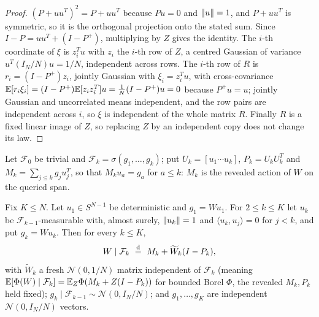 \begin{proof}
$(P+uu^T)^2=P+uu^T$ because $Pu=0$ and $\left\lVert u\right\rVert=1$, and $P+uu^T$ is symmetric, so it is the orthogonal projection onto the stated sum. Since $I-P=uu^T+(I-P^+)$, multiplying by $Z$ gives the identity. The $i$-th coordinate of $\xi$ is $z_i^Tu$ with $z_i$ the $i$-th row of $Z$, a centred Gaussian of variance $u^T(I_N/N)u=1/N$, independent across rows. The $i$-th row of $R$ is $r_i=(I-P^+)z_i$, jointly Gaussian with $\xi_i=z_i^Tu$, with cross-covariance $\mathbb{E}[r_i\xi_i]=(I-P^+)\mathbb{E}[z_iz_i^T]u=\frac1N(I-P^+)u=0$ because $P^+u=u$; jointly Gaussian and uncorrelated means independent, and the row pairs are independent across $i$, so $\xi$ is independent of the whole matrix $R$. Finally $R$ is a fixed linear image of $Z$, so replacing $Z$ by an independent copy does not change its law.
\end{proof}

Let $\mathcal F_0$ be trivial and $\mathcal F_k=\sigma(g_1,\dots,g_k)$; put $U_k=[u_1\cdots u_k]$, $P_k=U_kU_k^T$ and $M_k=\sum_{j\le k}g_ju_j^T$, so that $M_ku_a=g_a$ for $a\le k$: $M_k$ is the revealed action of $W$ on the queried span.

\begin{lemma}\label{lem:innovation}
Fix $K\le N$. Let $u_1\in S^{N-1}$ be deterministic and $g_1=Wu_1$. For $2\le k\le K$ let $u_k$ be $\mathcal F_{k-1}$-measurable with, almost surely, $\left\lVert u_k\right\rVert=1$ and $\langle u_k,u_j\rangle=0$ for $j<k$, and put $g_k=Wu_k$. Then for every $k\le K$,
\begin{equation}\label{eq:strong}
W\mid\mathcal F_k\ \overset{\mathrm{d}}{=}\ M_k+\widetilde W_k(I-P_k),
\end{equation}
with $\widetilde W_k$ a fresh $\mathcal N(0,1/N)$ matrix independent of $\mathcal F_k$ (meaning $\mathbb{E}[\Phi(W)\mid\mathcal F_k]=\mathbb{E}_Z\Phi(M_k+Z(I-P_k))$ for bounded Borel $\Phi$, the revealed $M_k,P_k$ held fixed); $g_k\mid\mathcal F_{k-1}\sim\mathcal N(0,I_N/N)$; and $g_1,\dots,g_K$ are independent $\mathcal N(0,I_N/N)$ vectors.
\end{lemma}

